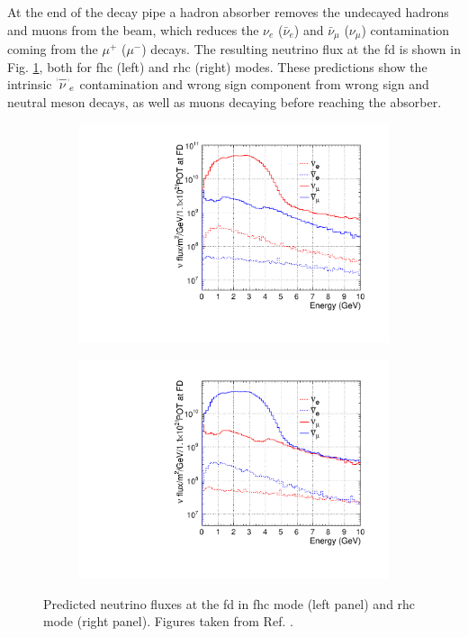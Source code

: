 At the end of the decay pipe a hadron absorber removes the undecayed hadrons and muons from the beam, which reduces the $\nu_{e}$ ($\bar{\nu}_{e}$) and $\bar{\nu}_{\mu}$ ($\nu_{\mu}$) contamination  coming from the $\mu^{+}$ ($\mu^{-}$) decays. The resulting neutrino flux at the \gls{fd} is shown in Fig. \ref{fig:dune_fd_flux}, both for \gls{fhc} (left) and \gls{rhc} (right) modes. These predictions show the intrinsic $\overset{\brabarb}{\nu}_{e}$ contamination and wrong sign component from wrong sign and neutral meson decays, as well as muons decaying before reaching the absorber.

\begin{figure}[h!]
	\begin{subfigure}{0.49\textwidth}
		\centering
		\includegraphics[width=.99\linewidth]{Images/DUNE/LBNF/dune_neutrino_fd_log}
	\end{subfigure}
	\begin{subfigure}{0.49\textwidth}
		\centering
		\includegraphics[width=.99\linewidth]{Images/DUNE/LBNF/dune_antineutrino_fd_log}
	\end{subfigure}
	\caption[Predicted neutrino fluxes at the \gls{fd} in \gls{fhc} mode and \gls{rhc} mode.]{Predicted neutrino fluxes at the \gls{fd} in \gls{fhc} mode (left panel) and \gls{rhc} mode (right panel). Figures taken from Ref. \cite{DUNE2020TDR2}.}
	\label{fig:dune_fd_flux}
\end{figure}


